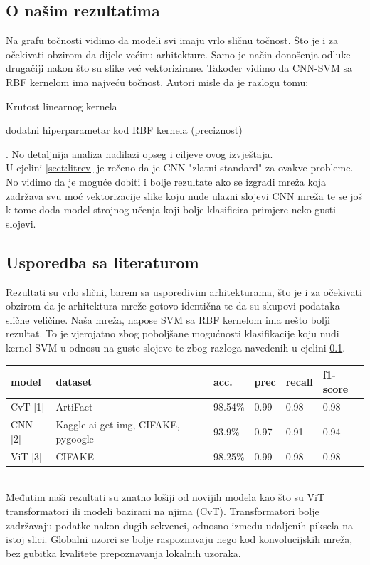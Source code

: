 \documentclass[conference]{IEEEtran}
\begin{document}
\subsection{O našim rezultatima}
\label{sect:ourres}
Na grafu točnosti vidimo da modeli svi imaju vrlo sličnu točnost. Što je i za očekivati obzirom da dijele većinu arhitekture. Samo je način donošenja odluke drugačiji nakon što su slike već vektorizirane. Također vidimo da CNN-SVM sa RBF kernelom ima najveću točnost. Autori misle da je razlogu tomu: 
\begin{inparaenum}\item Krutost linearnog kernela \item dodatni hiperparametar kod RBF kernela (preciznost) \end{inparaenum}.
No detaljnija analiza nadilazi opseg i ciljeve ovog izvještaja.\\
U cjelini \ref{sect:litrev} je rečeno da je CNN "zlatni standard" za ovakve probleme. No vidimo da je moguće dobiti i bolje rezultate ako se izgradi mreža koja zadržava svu moć vektorizacije slike koju nude ulazni slojevi CNN mreža te se još k tome doda model strojnog učenja koji bolje klasificira primjere neko gusti slojevi.


\subsection{Usporedba sa literaturom}
Rezultati su vrlo slični, barem sa usporedivim arhitekturama, što je i za očekivati obzirom da je arhitektura mreže gotovo identična te da su skupovi podataka
slične veličine. Naša mreža, napose SVM sa RBF kernelom ima nešto bolji rezultat. To je vjerojatno zbog poboljšane mogućnosti klasifikacije
koju nudi kernel-SVM u odnosu na guste slojeve te zbog razloga navedenih u cjelini \ref{sect:ourres}.

\begin{tabular}{|p{50pt}|p{50pt}|p{30pt}|p{25pt}|p{25pt}|p{25pt}|}
	\hline
	\textbf{model} & \textbf{dataset} & \textbf{acc.} & \textbf{prec} & \textbf{recall} & \textbf{f1-score}\\
	\hline
	CvT [1] & ArtiFact & 98.54\% & 0.99 & 0.98 & 0.98\\ \hline
	CNN [2] & Kaggle ai-get-img, CIFAKE, pygoogle & 93.9\% & 0.97 & 0.91 & 0.94\\ \hline
	ViT [3] & CIFAKE & 98.25\% & 0.99 & 0.98 & 0.98\\ \hline
\end{tabular}
\ \\
Međutim naši rezultati su znatno lošiji od novijih modela kao što su ViT transformatori ili modeli bazirani na njima (CvT). Transformatori bolje zadržavaju podatke nakon dugih sekvenci, odnosno između udaljenih piksela na istoj slici. Globalni uzorci se bolje raspoznavaju nego kod konvolucijskih mreža, bez gubitka kvalitete prepoznavanja lokalnih uzoraka.
\end{document}
